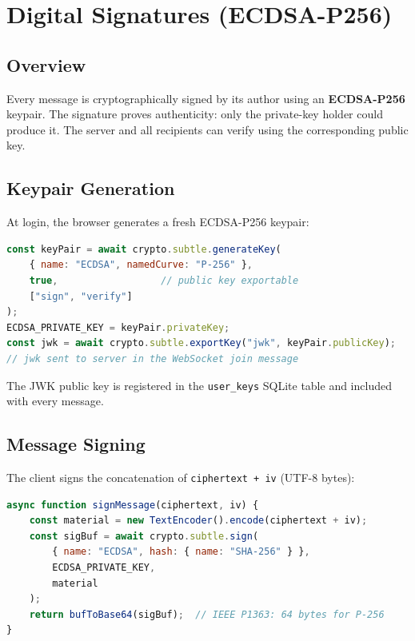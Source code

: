\documentclass[12pt, a4paper]{article}
\begin{document}
\section{Digital Signatures (ECDSA-P256)}

\subsection{Overview}

Every message is cryptographically signed by its author using an \textbf{ECDSA-P256} keypair. The signature proves authenticity: only the private-key holder could produce it. The server and all recipients can verify using the corresponding public key.

\subsection{Keypair Generation}

At login, the browser generates a fresh ECDSA-P256 keypair:

\begin{lstlisting}[language=JavaScript, caption={ECDSA Keypair Generation (app.js)}]
const keyPair = await crypto.subtle.generateKey(
    { name: "ECDSA", namedCurve: "P-256" },
    true,                  // public key exportable
    ["sign", "verify"]
);
ECDSA_PRIVATE_KEY = keyPair.privateKey;
const jwk = await crypto.subtle.exportKey("jwk", keyPair.publicKey);
// jwk sent to server in the WebSocket join message
\end{lstlisting}

The JWK public key is registered in the \texttt{user\_keys} SQLite table and included with every message.

\subsection{Message Signing}

The client signs the concatenation of \texttt{ciphertext + iv} (UTF-8 bytes):

\begin{lstlisting}[language=JavaScript, caption={Per-Message Signing (app.js)}]
async function signMessage(ciphertext, iv) {
    const material = new TextEncoder().encode(ciphertext + iv);
    const sigBuf = await crypto.subtle.sign(
        { name: "ECDSA", hash: { name: "SHA-256" } },
        ECDSA_PRIVATE_KEY,
        material
    );
    return bufToBase64(sigBuf);  // IEEE P1363: 64 bytes for P-256
}
\end{lstlisting}
\end{document}
